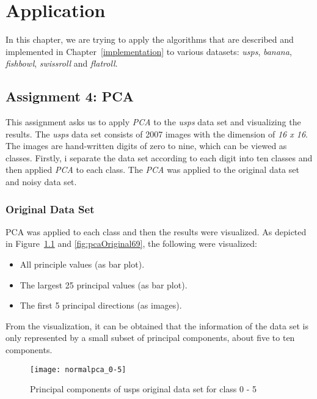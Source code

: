 \chapter{Application}
\label{application}

In this chapter, we are trying to apply the algorithms that are described and implemented in Chapter~\ref{implementation} to various datasets: \textit{usps}, \textit{banana}, \textit{fishbowl}, \textit{swissroll} and \textit{flatroll}.

\section{Assignment 4: PCA}
\label{assignment4}

This assignment asks us to apply \textit{PCA} to the \textit{usps} data set and visualizing the results. The \textit{usps} data set consists of 2007 images with the dimension of \textit{16 x 16}. The images are hand-written digits of zero to nine, which can be viewed as classes. Firstly, i separate the data set according to each digit into ten classes and then applied \textit{PCA} to each class. The \textit{PCA} was applied to the original data set and noisy data set.

\subsection{Original Data Set}
\label{ass4:original}

PCA was applied to each class and then the results were visualized. As depicted in Figure~\ref{fig:pcaOriginal05} and \ref{fig:pcaOriginal69}, the following were visualized:

\begin{itemize}
	\item All principle values (as bar plot).
	\item The largest 25 principal values (as bar plot).
	\item The first 5 principal directions (as images).
\end{itemize}

From the visualization, it can be obtained that the information of the data set is only represented by a small subset of principal components, about five to ten components. 

\begin{figure}[h!]
	\centering
	\texttt{[image: normalpca\_0-5]}
	\caption{Principal components of usps original data set for class 0 - 5}
	\label{fig:pcaOriginal05}
\end{figure}

